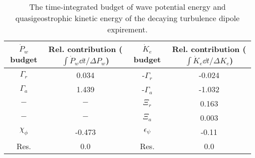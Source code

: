 \begin{table}
\begin{center}
\caption{The time-integrated budget of wave potential energy and quasigeostrophic                kinetic energy of the decaying turbulence dipole expirement. \label{table2}}
\begin{tabular}{cccc}
\hline
$\dot{P}_w$ budget & Rel. contribution ($\int\dot{P}_w \dd t/\Delta P_w$) & $\dot{K}_e$ budget & Rel. contribution ($\int\dot{K}_e \dd t/\Delta K_e$) \\
\hline
$\Gamma_r$ & 0.034 & -$\Gamma_r$ & -0.024 \\
$\Gamma_a$ & 1.439 & -$\Gamma_a$ & -1.032 \\
$-$ & $-$ & $\Xi_r$ & 0.163 \\
$-$ & $-$ & $\Xi_a$ & 0.003 \\
$\chi_\phi$ & -0.473 & $\epsilon_\psi$ & -0.11 \\
Res. & 0.0 & Res. & 0.0 \\
\end{tabular}
\end{center}
\end{table}
